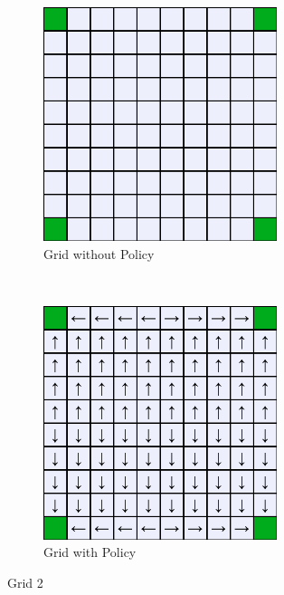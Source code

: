 \documentclass[a4paper, 11pt]{article}
\begin{document}
\begin{figure}[h!]
    \centering
    \begin{subfigure}[t]{0.5\textwidth}
        \centering
        \includegraphics[width=0.75\textwidth]{Images_Q1/grid2_default.png}
        \caption{Grid without Policy}
    \end{subfigure}%
    ~ 
    \begin{subfigure}[t]{0.5\textwidth}
        \centering
        \includegraphics[width=0.75\textwidth]{Images_Q1/grid2.png}
        \caption{Grid with Policy}
    \end{subfigure}
    \caption{Grid 2}
    \label{fig:grid2}
\end{figure}
\end{document}
